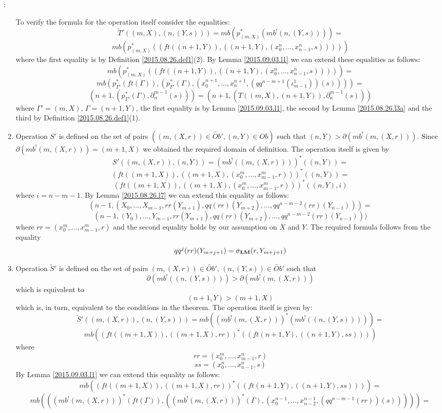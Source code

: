 \documentclass[11pt]{article}
\newenvironment{proof}{{\bf Proof}:}{\vskip 5mm }
\newcommand{\lm}{{\bf LM}}
\newcommand{\wt}{\widetilde}
\begin{document}
\begin{proof}
\begin{enumerate}
To verify the formula for the operation itself consider the equalities:
%
$$\wt{T}'((m,X),(n,(Y,s)))=mb(p_{(m,X)}^*(mb^!(n,(Y,s))))=$$
$$mb(p_{(m,X)}^*((ft((n+1,Y)),((n+1,Y),(x^{n}_0,\dots,x^{n}_{n-1},s)))))$$
%
where the first equality is by Definition \ref{2015.08.26.def1}(2). By Lemma \ref{2015.09.03.l1} we can extend these equalities as follows:
%
$$mb(p_{(m,X)}^*((ft((n+1,Y)),((n+1,Y),(x^{n}_0,\dots,x^{n}_{n-1},s)))))=$$
$$mb(p_{\Gamma'}^*(ft(\Gamma)),(p_{\Gamma'}^*(\Gamma),(x^{n+1}_0,\dots,x^{n+1}_{n},(qq^{n-m+1}(\iota^1_{m-1}))(s))))=$$
$$(n+1,(p_{\Gamma'}^*(\Gamma),\partial_{n}^{m-1}(s)))=(n+1,(T((m,X),(n+1,Y)),\partial_n^{m-1}(s)))$$
%
where $\Gamma'=(m,X)$, $\Gamma=(n+1,Y)$, the first equality is by Lemma \ref{2015.09.03.l1}, the second by Lemma \ref{2015.08.26.l3a} and the third by Definition \ref{2015.08.26.def1}(1). 
%
%
\item Operation $S'$ is defined on the set of pairs $((m,(X,r))\in \wt{Ob}',(n,Y)\in Ob)$ such that $(n,Y)>\partial(mb^!(m,(X,r)))$. Since $\partial(mb^!(m,(X,r)))=(m+1,X)$ we obtained the required domain of definition. The operation itself is given by
%
$$S'((m,(X,r)),(n,Y))=(mb^!((m,(X,r))))^*((n,Y))=$$
$$(ft((m+1,X)),((m+1,X),(x^{m}_0,\dots,x^{m}_{m-1},r)))^*((n,Y))=$$
$$(ft((m+1,X)),((m+1,X),(x^{m}_0,\dots,x^{m}_{m-1},r)))^*((n,Y),i)$$
%
where $i=n-m-1$. By Lemma \ref{2015.08.26.l7} we can extend this equality as follows:
%
$$(n-1,(X_0,\dots,X_{m-1},rr(Y_{m+1}),qq(rr)(Y_{m+2}),\dots,qq^{n-m-2}(rr)(Y_{n-1})))=$$
$$(n-1,(Y_0),\dots,Y_{m-1},rr(Y_{m+1}),qq(rr)(Y_{m+2}),\dots,qq^{n-m-2}(rr)(Y_{n-1})))$$
%
where $rr=(x^{m}_0,\dots,x^{m}_{m-1},r)$ and the second equality holds by our assumption on $X$ and $Y$. The required formula follows from the equality 
%
$$qq^j(rr)(Y_{m+j+1})=\sigma_{\lm}(r,Y_{m+j+1})$$
%
\item Operation $\wt{S}'$ is defined on the set of pairs $(m,(X,r))\in \wt{Ob}'$, $(n,(Y,s))\in \wt{Ob}'$ such that 
%
$$\partial(mb^!((n,(Y,s))))>\partial(mb^!(m,(X,r)))$$
%
which is equivalent to 
%
$$(n+1,Y)>(m+1,X)$$
%
which is, in turn, equivalent to the conditions in the theorem. The operation itself is given by:
%
$$\wt{S}'((m,(X,r)),(n,(Y,s)))=mb((mb^!(m,(X,r)))^*(mb^!((n,(Y,s)))))=$$
$$mb((ft((m+1,X)),((m+1,X),rr))^*((ft(n+1,Y),((n+1,Y),ss))))$$
%
where
%
$$rr=(x_0^m,\dots,x_{m-1}^n,r)$$
$$ss=(x_0^n,\dots,x_{n-1}^n,s)$$
%
By Lemma \ref{2015.09.03.l1} we can extend this equality as follows:
%
$$mb((ft((m+1,X)),((m+1,X),rr))^*((ft(n+1,Y),((n+1,Y),ss))))=$$
$$mb(((mb^!(m,(X,r)))^*(ft(\Gamma)),((mb^!(m,(X,r)))^*(\Gamma),(x_0^{n-1},\dots,x^{n-1}_{n-2},(qq^{n-m-1}(rr))(s)))))=$$

\end{enumerate}
\end{proof}
\end{document}
